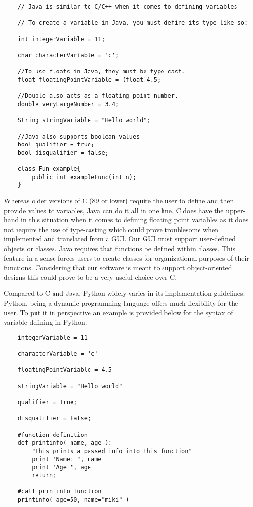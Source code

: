 \documentclass[journal,10pt,onecolumn,compsoc]{IEEEtran} \usepackage[margin=1.0in]{geometry} \usepackage{pdfpages} \usepackage{graphicx}
\begin{document}
\begin{verbatim}
	// Java is similar to C/C++ when it comes to defining variables

	// To create a variable in Java, you must define its type like so:

	int integerVariable = 11;

	char characterVariable = 'c';

	//To use floats in Java, they must be type-cast. 
	float floatingPointVariable = (float)4.5; 
    
	//Double also acts as a floating point number.
	double veryLargeNumber = 3.4;

	String stringVariable = "Hello world";
    
	//Java also supports boolean values
	bool qualifier = true;
	bool disqualifier = false;
    
	class Fun_example{
    	public int exampleFunc(int n);
	}
\end{verbatim}

\noindent Whereas older versions of C (89 or lower) require the user to define and then provide values to variables, Java can do it all in one line. \cite{javavar} 
C does have the upper-hand in this situation when it comes to defining floating point variables as it does not require the use of type-casting which could prove troublesome when implemented and translated from a GUI.
Our GUI must support user-defined objects or classes.
Java requires that functions be defined within classes.\cite{javafunction}
This feature in a sense forces users to create classes for organizational purposes of their functions.
Considering that our software is meant to support object-oriented designs this could prove to be a very useful choice over C.

\noindent Compared to C and Java, Python widely varies in its implementation guidelines.
Python, being a dynamic programming language offers much flexibility for the user.
To put it in perspective an example is provided below for the syntax of variable defining in Python.

\begin{verbatim}
	integerVariable = 11

	characterVariable = 'c'

	floatingPointVariable = 4.5

	stringVariable = "Hello world"

	qualifier = True;

	disqualifier = False;
    
	#function definition
	def printinfo( name, age ):
		"This prints a passed info into this function"
		print "Name: ", name
		print "Age ", age
		return;
	
	#call printinfo function
	printinfo( age=50, name="miki" )
\end{verbatim}
\end{document}
